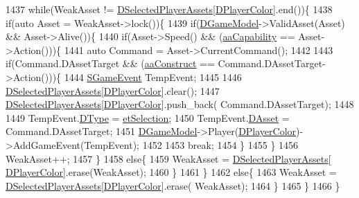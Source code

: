 \begin{DoxyCode}
1437     \textcolor{keywordflow}{while}(WeakAsset != \hyperlink{classCApplicationData_a05c1087d5a5c4ddc14fcb37444f1642b}{DSelectedPlayerAssets}[\hyperlink{classCApplicationData_a53550939b20cba70570f113e4d1c5d02}{DPlayerColor}].end())\{
1438         \textcolor{keywordflow}{if}(\textcolor{keyword}{auto} Asset = WeakAsset->lock())\{
1439             \textcolor{keywordflow}{if}(\hyperlink{classCApplicationData_a32b50c7c1cbac3cfd67c7f775b1d6fee}{DGameModel}->ValidAsset(Asset) && Asset->Alive())\{
1440                 \textcolor{keywordflow}{if}(Asset->Speed() && (\hyperlink{GameDataTypes_8h_ab47668e651a3032cfb9c40ea2d60d670acf9fb164e8abd71c71f4a8c7fda360d4}{aaCapability} == Asset->Action()))\{
1441                     \textcolor{keyword}{auto} Command = Asset->CurrentCommand();
1442                     
1443                     \textcolor{keywordflow}{if}(Command.DAssetTarget && (\hyperlink{GameDataTypes_8h_ab47668e651a3032cfb9c40ea2d60d670a7ef6b863f66dd7dcc95a199cd758ae1d}{aaConstruct} == Command.DAssetTarget->Action()))\{
1444                         \hyperlink{structSGameEvent}{SGameEvent} TempEvent;
1445                         
1446                         \hyperlink{classCApplicationData_a05c1087d5a5c4ddc14fcb37444f1642b}{DSelectedPlayerAssets}[\hyperlink{classCApplicationData_a53550939b20cba70570f113e4d1c5d02}{DPlayerColor}].clear();
1447                         \hyperlink{classCApplicationData_a05c1087d5a5c4ddc14fcb37444f1642b}{DSelectedPlayerAssets}[\hyperlink{classCApplicationData_a53550939b20cba70570f113e4d1c5d02}{DPlayerColor}].push\_back(
      Command.DAssetTarget);
1448                         
1449                         TempEvent.\hyperlink{structSGameEvent_afa10562e243f4ac2b473b655cc58fee7}{DType} = \hyperlink{GameModel_8h_abfcf510bafec7c6429906a6ecaac656da38393c2ecd9404ab15f2f9bb5aab0497}{etSelection};
1450                         TempEvent.\hyperlink{structSGameEvent_a40c85eeac83b96887b7449c9bdc5d624}{DAsset} = Command.DAssetTarget;
1451                         \hyperlink{classCApplicationData_a32b50c7c1cbac3cfd67c7f775b1d6fee}{DGameModel}->Player(\hyperlink{classCApplicationData_a53550939b20cba70570f113e4d1c5d02}{DPlayerColor})->AddGameEvent(TempEvent);
1452                                 
1453                         \textcolor{keywordflow}{break};
1454                     \}
1455                 \}
1456                 WeakAsset++;
1457             \}
1458             \textcolor{keywordflow}{else}\{
1459                 WeakAsset = \hyperlink{classCApplicationData_a05c1087d5a5c4ddc14fcb37444f1642b}{DSelectedPlayerAssets}[
      \hyperlink{classCApplicationData_a53550939b20cba70570f113e4d1c5d02}{DPlayerColor}].erase(WeakAsset);   
1460             \}
1461         \}
1462         \textcolor{keywordflow}{else}\{
1463             WeakAsset = \hyperlink{classCApplicationData_a05c1087d5a5c4ddc14fcb37444f1642b}{DSelectedPlayerAssets}[\hyperlink{classCApplicationData_a53550939b20cba70570f113e4d1c5d02}{DPlayerColor}].erase(
      WeakAsset);   
1464         \}
1465     \}
1466 \}
\end{DoxyCode}
